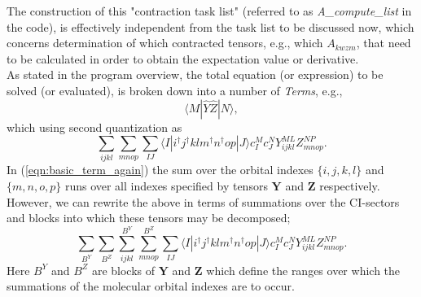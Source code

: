 \noindent  The construction of this "contraction task list" (referred to as \emph{A\_compute\_list} in the code), 
is effectively independent from the task list to be discussed now, which concerns determination of which
contracted tensors, e.g., which $A_{kwzm}$, that need to be calculated in order to obtain the expectation value
or derivative.\\

\noindent As stated in the program overview, the total equation (or expression) to be solved (or evaluated), is 
broken down into a number of \emph{Terms}, e.g., 
\begin{equation*}
\langle M | \hat{Y}\hat{Z} | N \rangle ,
\end{equation*}
which using second quantization as
\begin{equation}
\sum_{ijkl}\sum_{mnop} \sum_{IJ} \langle I | i^{\dagger}j^{\dagger}klm^{\dagger}n^{\dagger}op | J \rangle c^{M}_{I} c_{J}^{N} Y^{ML}_{ijkl}Z^{NP}_{mnop}.
\label{eqn:basic_term_again}
\end{equation}
\noindent In (\ref{eqn:basic_term_again}) the sum over the orbital indexes
$\{i,j,k,l\}$ and  $\{m,n,o,p\}$ runs over all indexes specified by tensors
$\mathbf{Y}$ and $\mathbf{Z}$ respectively. However, we can rewrite the above
in terms of summations over the CI-sectors and blocks into which these tensors may be
decomposed;
\begin{equation}
\sum_{B^{Y}}\sum_{B^{Z}}
\sum^{B^{Y}}_{ijkl}\sum^{B^{Z}}_{mnop} \sum_{IJ} \langle I | i^{\dagger}j^{\dagger}klm^{\dagger}n^{\dagger}op | J \rangle c^{M}_{I} c_{J}^{N} Y^{ML}_{ijkl}Z^{NP}_{mnop}.
\label{eqn:basic_term_block_wise}
\end{equation}
\noindent Here $B^{Y}$ and $B^{Z}$ are blocks of $\mathbf{Y}$ and $\mathbf{Z}$
which define the ranges over which the summations of the molecular orbital
indexes are to occur.\\

